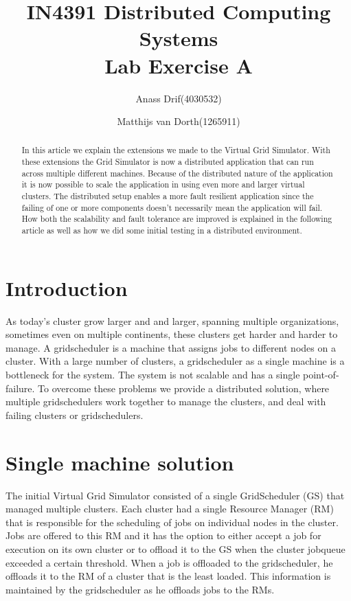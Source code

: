 \documentclass[twocolumn,a4paper]{article}
\title{\textbf{IN4391 Distributed Computing Systems \\ Lab Exercise A}}
\author{Anass Drif(4030532) \and Matthijs van Dorth(1265911)}
\begin{document}
\maketitle


\begin{abstract}
In this article we explain the extensions we made to the Virtual Grid Simulator. With these extensions the Grid Simulator is now a distributed application that can run across multiple different machines. Because of the distributed nature of the application it is now possible to scale the application in using even more and larger virtual clusters. The distributed setup enables a more fault resilient application since the failing of one or more components doesn't necessarily mean the application will fail. How both the scalability and fault tolerance are improved is explained in the following article as well as how we did some initial testing in a distributed environment.
\end{abstract}

\section{Introduction}
As today's cluster grow larger and and larger, spanning multiple organizations, sometimes even on multiple continents, these clusters get harder and harder to manage. A gridscheduler is a machine that assigns jobs to different nodes on a cluster. With a large number of clusters, a gridscheduler as a single machine is a bottleneck for the system. The system is not scalable and has a single point-of-failure. To overcome these problems we provide a distributed solution, where multiple gridschedulers work together to manage the clusters, and deal with failing clusters or gridschedulers.

\section{Single machine solution}
The initial Virtual Grid Simulator consisted of a single GridScheduler (GS) that managed multiple clusters. Each cluster had a single Resource Manager (RM) that is responsible for the scheduling of jobs on individual nodes in the cluster. Jobs are offered to this RM and it has the option to either accept a job for execution on its own cluster or to offload it to the GS when the cluster jobqueue exceeded a certain threshold. When a job is offloaded to the gridscheduler, he offloads it to the RM of a cluster that is the least loaded. This information is maintained by the gridscheduler as he offloads jobs to the RMs.
\end{document}
